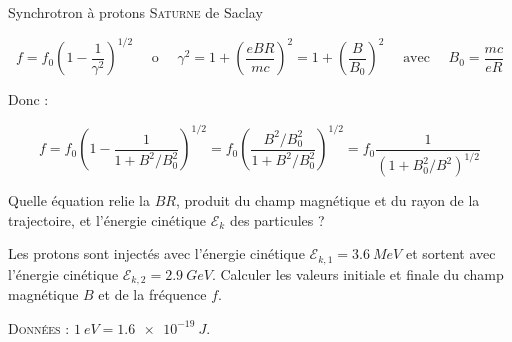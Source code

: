 \begin{exo}[PC][2][TD]{Synchrotron à protons \textsc{Saturne} de Saclay}
\begin{quest}
{$$
f=f_0\left(1-\frac{1}{\gamma^2}\right)^{1 / 2} \quad \text { o } \quad \gamma^2=1+\left(\frac{e B R}{m c}\right)^2=1+\left(\frac{B}{B_0}\right)^2 \quad \text { avec } \quad B_0=\frac{m c}{e R}
$$


Donc :

$$
f=f_0\left(1-\frac{1}{1+B^2 / B_0^2}\right)^{1 / 2}=f_0\left(\frac{B^2 / B_0^2}{1+B^2 / B_0^2}\right)^{1 / 2}=f_0 \frac{1}{\left(1+B_0^2 / B^2\right)^{1 / 2}}
$$


    }
    \item	
    Quelle équation relie la  $B R$, produit du champ magnétique et du rayon de la trajectoire, et l'énergie cinétique $\mathcal{E}_k$ des particules ?

    \item Les protons sont injectés avec l'énergie cinétique $\mathcal{E}_{k, 1}=\SI{3,6}{MeV}$ et sortent avec l'énergie cinétique $\mathcal{E}_{k, 2}=\SI{2,9}{GeV}$. Calculer les valeurs initiale et finale du champ magnétique $B$ et de la fréquence $f$.
    
     \textsc{Données :} $\SI{1}{eV} = \SI{1,6e-19}{J}$.


\end{quest}
\end{exo}


